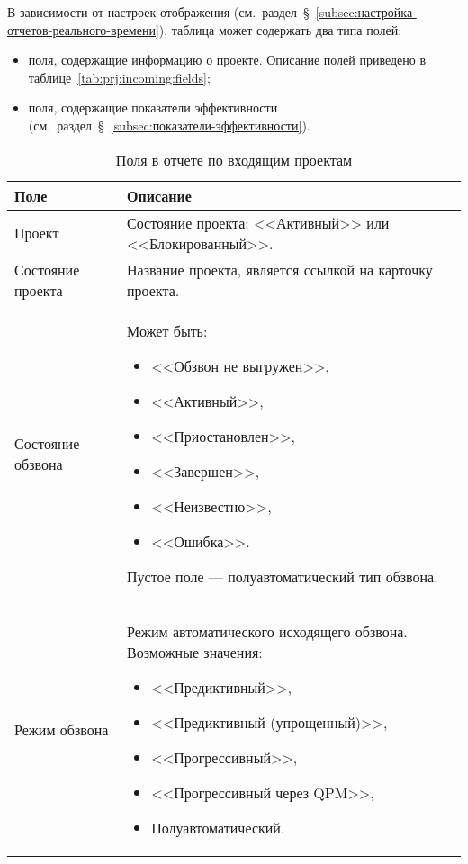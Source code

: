 В зависимости от настроек отображения (см.~раздел~\S~\ref{subsec:настройка-отчетов-реального-времени}), таблица может содержать два типа полей:
\begin{itemize}
    \item поля, содержащие информацию о проекте. Описание полей приведено в таблице~\ref{tab:prj:incoming:fields};
    \item поля, содержащие показатели эффективности (см.~раздел~\S~\ref{subsec:показатели-эффективности}).
\end{itemize}
\begin{table}[ht]
    \caption{Поля в отчете по входящим проектам}
    \begin{small}
        \begin{tabular}{|p{}|p{}|}
            \hline
            Поле & Описание \\
            \hline
            Проект & Состояние проекта: <<Активный>> или <<Блокированный>>. \\
            \hline
            Состояние проекта & Название проекта, является ссылкой на карточку проекта. \\
            \hline
            Состояние обзвона & Может быть:
            \begin{itemize} %
                \item <<Обзвон не выгружен>>,
                \item <<Активный>>,
                \item <<Приостановлен>>,
                \item <<Завершен>>,
                \item <<Неизвестно>>,
                \item <<Ошибка>>.
            \end{itemize}
            Пустое поле --- полуавтоматический тип обзвона. \\
            \hline
            Режим обзвона & Режим автоматического исходящего обзвона. Возможные значения:
            \begin{itemize}
                \item <<Предиктивный>>,
                \item <<Предиктивный (упрощенный)>>,
                \item <<Прогрессивный>>,
                \item <<Прогрессивный через QPM>>,
                \item Полуавтоматический.

\end{itemize}
\end{tabular}
\end{small}
\end{table}
